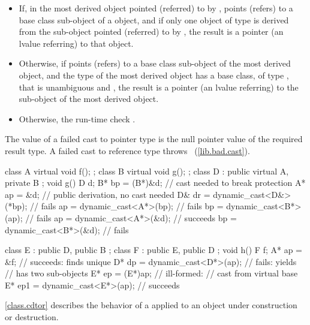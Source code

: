 \begin{itemize}
\item If, in the most derived object pointed (referred) to by ,
 points (refers) to a  base class sub-object of a
 object, and if only one object of type  is derived
from the sub-object pointed (referred) to by , the result is
a pointer (an lvalue referring) to that  object.

\item Otherwise, if  points (refers) to a  base
class sub-object of the most derived object, and the type of the most
derived object has a base class, of type , that is unambiguous
and , the result is a pointer (an lvalue referring) to the
 sub-object of the most derived object.

\item Otherwise, the run-time check .
\end{itemize}

\pnum
The value of a failed cast to pointer type is the null pointer value of
the required result type. A failed cast to reference type throws
~(\ref{lib.bad.cast}).

%
%
\enterexample 

\begin{codeblock}
class A { virtual void f(); };
class B { virtual void g(); };
class D : public virtual A, private B {};
void g()
{
    D   d;
    B*  bp = (B*)&d;            // cast needed to break protection
    A*  ap = &d;                // public derivation, no cast needed
    D&  dr = dynamic_cast<D&>(*bp);	// fails
    ap = dynamic_cast<A*>(bp);		// fails
    bp = dynamic_cast<B*>(ap);		// fails
    ap = dynamic_cast<A*>(&d);		// succeeds
    bp = dynamic_cast<B*>(&d);		// fails
}

class E : public D, public B {};
class F : public E, public D {};
void h()
{
    F   f;
    A*  ap  = &f;			// succeeds: finds unique 
    D*  dp  = dynamic_cast<D*>(ap);	// fails: yields 
					//  has two  sub-objects
    E*  ep  = (E*)ap;			// ill-formed:
					// cast from virtual base
    E*  ep1 = dynamic_cast<E*>(ap);	// succeeds
}
\end{codeblock}
\exitexampleb
\enternote
\ref{class.cdtor} describes the behavior of a 
applied to an object under construction or destruction.
\exitnote 

